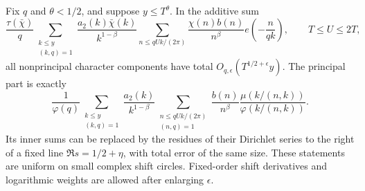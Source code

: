 \begin{lemma}
\label{lem:A048-character-average}
Fix \(q\) and \(\theta<1/2\), and suppose \(y\le T^\theta\).
In the additive sum
\begin{equation}\label{eq:A048-additive}
 \frac{\tau(\bar\chi)}q
 \sum_{\substack{k\le y\\(k,q)=1}}
   \frac{a_2(k)\bar\chi(k)}{k^{1-\beta}}
 \sum_{n\le qUk/(2\pi)}
   \frac{\chi(n)b(n)}{n^\beta}
                      e\left(-\frac n{qk}\right),
       \qquad T\le U\le2T,
\end{equation}
all nonprincipal character components have total
\(O_{q,\epsilon}(T^{1/2+\epsilon}y)\).
The principal part is exactly
\begin{equation}\label{eq:A048-principal}
 \frac1{\varphi(q)}
 \sum_{\substack{k\le y\\(k,q)=1}}\frac{a_2(k)}{k^{1-\beta}}
 \sum_{\substack{n\le qUk/(2\pi)\\(n,q)=1}}
   \frac{b(n)}{n^\beta}
          \frac{\mu(k/(n,k))}{\varphi(k/(n,k))}.
\end{equation}
Its inner sums can be replaced by the residues of their
Dirichlet series to the right of a fixed line
\(\Re s=1/2+\eta\), with total error of the same size.
These statements are uniform on small complex shift
circles. Fixed-order shift derivatives and logarithmic
weights are allowed after enlarging \(\epsilon\).
\end{lemma}

